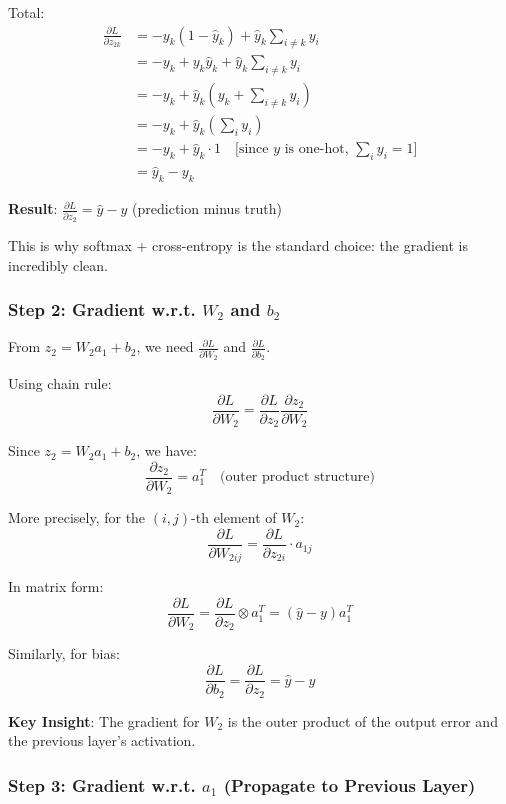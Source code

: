 Total:
\begin{align*}
\frac{\partial L}{\partial z_{2k}} &= -y_k(1 - \hat{y}_k) + \hat{y}_k \sum_{i \neq k} y_i \\
&= -y_k + y_k \hat{y}_k + \hat{y}_k \sum_{i \neq k} y_i \\
&= -y_k + \hat{y}_k\left(y_k + \sum_{i \neq k} y_i\right) \\
&= -y_k + \hat{y}_k \left(\sum_i y_i\right) \\
&= -y_k + \hat{y}_k \cdot 1 \quad \text{[since } y \text{ is one-hot, } \sum_i y_i = 1\text{]} \\
&= \hat{y}_k - y_k
\end{align*}

\textbf{Result}: $\frac{\partial L}{\partial z_2} = \hat{y} - y$ (prediction minus truth)

This is why softmax + cross-entropy is the standard choice: the gradient is incredibly clean.

\subsubsection{Step 2: Gradient w.r.t. $W_2$ and $b_2$}

From $z_2 = W_2 a_1 + b_2$, we need $\frac{\partial L}{\partial W_2}$ and $\frac{\partial L}{\partial b_2}$.

Using chain rule:
\[
\frac{\partial L}{\partial W_2} = \frac{\partial L}{\partial z_2} \frac{\partial z_2}{\partial W_2}
\]

Since $z_2 = W_2 a_1 + b_2$, we have:
\[
\frac{\partial z_2}{\partial W_2} = a_1^T \quad \text{(outer product structure)}
\]

More precisely, for the $(i,j)$-th element of $W_2$:
\[
\frac{\partial L}{\partial W_{2ij}} = \frac{\partial L}{\partial z_{2i}} \cdot a_{1j}
\]

In matrix form:
\[
\frac{\partial L}{\partial W_2} = \frac{\partial L}{\partial z_2} \otimes a_1^T = (\hat{y} - y) a_1^T
\]

Similarly, for bias:
\[
\frac{\partial L}{\partial b_2} = \frac{\partial L}{\partial z_2} = \hat{y} - y
\]

\textbf{Key Insight}: The gradient for $W_2$ is the outer product of the output error and the previous layer's activation.

\subsubsection{Step 3: Gradient w.r.t. $a_1$ (Propagate to Previous Layer)}

